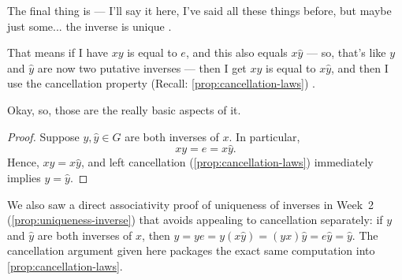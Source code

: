 \begin{speech}[00:47:40 - 00:48:15]
The final thing is --- I'll say it here, I've said all these things before, but maybe just some... the inverse is unique .

That means if I have $xy$ is equal to $e$, and this also equals $x\hat{y}$  --- so, that's like $y$ and $\hat{y}$ are now two putative inverses --- then I get $xy$ is equal to $x\hat{y}$, and then I use the cancellation property (Recall: \cref{prop:cancellation-laws}) .

Okay, so, those are the really basic aspects of it.
\end{speech}

\begin{content}

\begin{proof}
Suppose $y, \hat{y} \in G$ are both inverses of $x$. In particular,
\[
xy = e = x\hat{y}.
\]
Hence, $xy = x\hat{y}$, and left cancellation (\cref{prop:cancellation-laws}) immediately implies $y = \hat{y}$.
\end{proof}
\end{content}

\begin{aiNote}
We also saw a direct associativity proof of uniqueness of inverses in Week~2 (\cref{prop:uniqueness-inverse}) that avoids appealing to cancellation separately: if $y$ and $\hat{y}$ are both inverses of $x$, then $y = ye = y(x\hat{y}) = (yx)\hat{y} = e\hat{y} = \hat{y}$. The cancellation argument given here packages the exact same computation into \cref{prop:cancellation-laws}.
\end{aiNote}

\begin{hidden}
\end{hidden}


